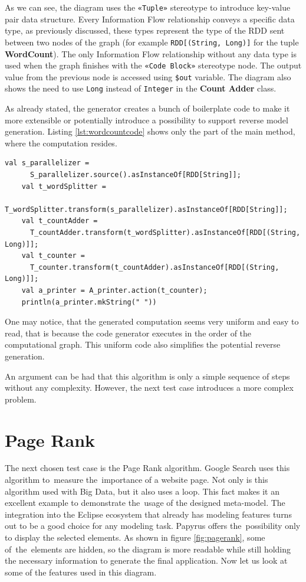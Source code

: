 As we can see, the diagram uses the \texttt{«Tuple»} stereotype to introduce key-value pair data structure. Every Information Flow relationship conveys a specific data type, as previously discussed, these types represent the type of the RDD sent between two nodes of the graph (for example \texttt{RDD[(String, Long)]} for the tuple \textbf{WordCount}). The only Information Flow relationship without any data type is used when the graph finishes with the \texttt{«Code Block»} stereotype node. The output value from the previous node is accessed using \texttt{\$out} variable. The diagram also shows the need to use \texttt{Long} instead of \texttt{Integer} in the \textbf{Count Adder} class. 

As already stated, the generator creates a bunch of boilerplate code to make it more extensible or potentially introduce a possibility to support reverse model generation. Listing \ref{lst:wordcountcode} shows only the part of the main method, where the computation resides. 

\begin{lstlisting}[style=myScalastyle, caption={The generated Word Count computation}, label={lst:wordcountcode}]
	val s_parallelizer = 
	  S_parallelizer.source().asInstanceOf[RDD[String]];
	val t_wordSplitter = 
	  T_wordSplitter.transform(s_parallelizer).asInstanceOf[RDD[String]];
	val t_countAdder = 
	  T_countAdder.transform(t_wordSplitter).asInstanceOf[RDD[(String, Long)]];
	val t_counter = 
	  T_counter.transform(t_countAdder).asInstanceOf[RDD[(String, Long)]];
	val a_printer = A_printer.action(t_counter);
	println(a_printer.mkString(" "))
\end{lstlisting}

One may notice, that the generated computation seems very uniform and easy to read, that is because the code generator executes in the order of the computational graph. This uniform code also simplifies the potential reverse generation.

An argument can be had that this algorithm is only a simple sequence of steps without any complexity. However, the next test case introduces a more complex problem.



\section{Page Rank}

The next chosen test case is the Page Rank algorithm. Google Search uses this algorithm to~measure the~importance of a website page. Not only is this algorithm used with Big Data, but it also uses a loop. This fact makes it an excellent example to demonstrate the~usage of the designed meta-model. The integration into the Eclipse ecosystem that already has modeling features turns out to be a good choice for any modeling task. Papyrus offers the~possibility only to display the selected elements. As shown in figure \ref{fig:pagerank}, some of~the~elements are hidden, so the diagram is more readable while still holding the necessary information to generate the final application. Now let us look at some of the features used in this diagram. 

